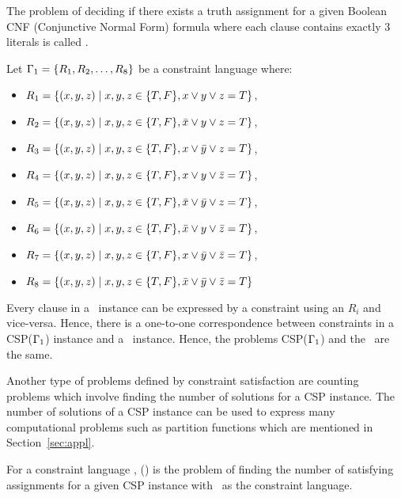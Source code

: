 \begin{example}[\tsat]\label{exm:3sat}
The problem of deciding if there exists a truth assignment for a 
given Boolean CNF (Conjunctive Normal Form) formula where each
clause contains exactly 3 literals is called \tsat\@.

Let \(\Gamma_1=\{{R_1,R_2,\dotsc, R_8}\}\) be a constraint language where:
\begin{itemize}
\item \(R_1=\{(x,y,z)\mid x,y,z\in \{{T,F}\}, x \lor y \lor z = T\}\), 
\item \(R_2=\{(x,y,z)\mid x,y,z\in \{{T,F}\}, \bar x \lor y \lor z = T\}\), 
\item \(R_3=\{(x,y,z)\mid x,y,z\in \{{T,F}\}, x \lor \bar y \lor z = T\}\), 
\item \(R_4=\{(x,y,z)\mid x,y,z\in \{{T,F}\}, x \lor y \lor \bar z = T\}\), 
\item \(R_5=\{(x,y,z)\mid x,y,z\in \{{T,F}\}, \bar x \lor \bar y \lor z = T\}\), 
\item \(R_6=\{(x,y,z)\mid x,y,z\in \{{T,F}\}, \bar x \lor y \lor \bar z = T\}\), 
\item \(R_7=\{(x,y,z)\mid x,y,z\in \{{T,F}\}, x \lor \bar y \lor \bar z = T\}\), 
\item \(R_8=\{(x,y,z)\mid x,y,z\in \{{T,F}\}, \bar x \lor \bar y \lor \bar z = T\}\)
\end{itemize}

Every clause in a \tsat\ instance can be expressed by a constraint using an \(R_i\) 
and vice-versa. Hence, there is a one-to-one correspondence between constraints 
in a CSP(\(\Gamma_1\)) instance and a \tsat\ instance. Hence,
the problems CSP(\(\Gamma_1\)) and the \tsat\ are the same.
\end{example}


Another type of problems defined by constraint satisfaction are
counting problems which involve finding the number of solutions for a CSP instance.
The number of solutions of a CSP instance can be used to express many computational problems
such as partition functions which are mentioned in Section~\ref{sec:appl}.

\begin{defi}[\ccsp(\mrelset)] 
For a constraint language \mrelset,
\ccsp(\mrelset) is the problem of finding the number of satisfying assignments for a
given CSP instance with \mrelset\ as the constraint language.
\end{defi}

